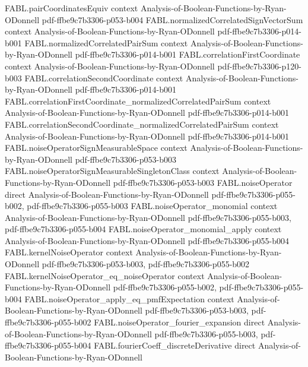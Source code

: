 \begin{theorem}
\proofstep
  {FABL.pairCoordinatesEquiv}
  {context}
  {Analysis-of-Boolean-Functions-by-Ryan-ODonnell}
  {pdf-ffbe9c7b3306-p053-b004}
\proofstep
  {FABL.normalizedCorrelatedSignVectorSum}
  {context}
  {Analysis-of-Boolean-Functions-by-Ryan-ODonnell}
  {pdf-ffbe9c7b3306-p014-b001}
\proofstep
  {FABL.normalizedCorrelatedPairSum}
  {context}
  {Analysis-of-Boolean-Functions-by-Ryan-ODonnell}
  {pdf-ffbe9c7b3306-p014-b001}
\proofstep
  {FABL.correlationFirstCoordinate}
  {context}
  {Analysis-of-Boolean-Functions-by-Ryan-ODonnell}
  {pdf-ffbe9c7b3306-p120-b003}
\proofstep
  {FABL.correlationSecondCoordinate}
  {context}
  {Analysis-of-Boolean-Functions-by-Ryan-ODonnell}
  {pdf-ffbe9c7b3306-p014-b001}
\proofstep
  {FABL.correlationFirstCoordinate_normalizedCorrelatedPairSum}
  {context}
  {Analysis-of-Boolean-Functions-by-Ryan-ODonnell}
  {pdf-ffbe9c7b3306-p014-b001}
\proofstep
  {FABL.correlationSecondCoordinate_normalizedCorrelatedPairSum}
  {context}
  {Analysis-of-Boolean-Functions-by-Ryan-ODonnell}
  {pdf-ffbe9c7b3306-p014-b001}
\proofstep
  {FABL.noiseOperatorSignMeasurableSpace}
  {context}
  {Analysis-of-Boolean-Functions-by-Ryan-ODonnell}
  {pdf-ffbe9c7b3306-p053-b003}
\proofstep
  {FABL.noiseOperatorSignMeasurableSingletonClass}
  {context}
  {Analysis-of-Boolean-Functions-by-Ryan-ODonnell}
  {pdf-ffbe9c7b3306-p053-b003}
\proofstep
  {FABL.noiseOperator}
  {direct}
  {Analysis-of-Boolean-Functions-by-Ryan-ODonnell}
  {pdf-ffbe9c7b3306-p055-b002,
    pdf-ffbe9c7b3306-p055-b003}
\proofstep
  {FABL.noiseOperator_monomial}
  {context}
  {Analysis-of-Boolean-Functions-by-Ryan-ODonnell}
  {pdf-ffbe9c7b3306-p055-b003,
    pdf-ffbe9c7b3306-p055-b004}
\proofstep
  {FABL.noiseOperator_monomial_apply}
  {context}
  {Analysis-of-Boolean-Functions-by-Ryan-ODonnell}
  {pdf-ffbe9c7b3306-p055-b004}
\proofstep
  {FABL.kernelNoiseOperator}
  {context}
  {Analysis-of-Boolean-Functions-by-Ryan-ODonnell}
  {pdf-ffbe9c7b3306-p053-b003,
    pdf-ffbe9c7b3306-p055-b002}
\proofstep
  {FABL.kernelNoiseOperator_eq_noiseOperator}
  {context}
  {Analysis-of-Boolean-Functions-by-Ryan-ODonnell}
  {pdf-ffbe9c7b3306-p055-b002,
    pdf-ffbe9c7b3306-p055-b004}
\proofstep
  {FABL.noiseOperator_apply_eq_pmfExpectation}
  {context}
  {Analysis-of-Boolean-Functions-by-Ryan-ODonnell}
  {pdf-ffbe9c7b3306-p053-b003,
    pdf-ffbe9c7b3306-p055-b002}
\proofstep
  {FABL.noiseOperator_fourier_expansion}
  {direct}
  {Analysis-of-Boolean-Functions-by-Ryan-ODonnell}
  {pdf-ffbe9c7b3306-p055-b003,
    pdf-ffbe9c7b3306-p055-b004}
\proofstep
  {FABL.fourierCoeff_discreteDerivative}
  {direct}
  {Analysis-of-Boolean-Functions-by-Ryan-ODonnell}

\end{theorem}
